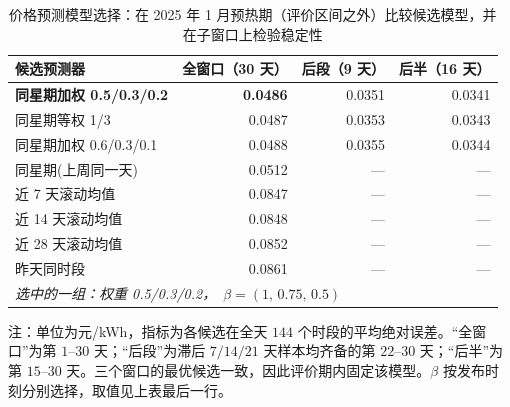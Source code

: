 \begin{table}[htbp]
  \centering
  \caption{价格预测模型选择：在 2025 年 1 月预热期（评价区间之外）比较候选模型，并在子窗口上检验稳定性}
  \label{tab:p4-select}
  \small
  \begin{tabular}{lrrr}
    \toprule
    候选预测器 & 全窗口（30 天） & 后段（9 天） & 后半（16 天） \\
    \midrule
    \textbf{同星期加权 0.5/0.3/0.2} & \textbf{0.0486} & 0.0351 & 0.0341 \\
    同星期等权 1/3 & 0.0487 & 0.0353 & 0.0343 \\
    同星期加权 0.6/0.3/0.1 & 0.0488 & 0.0355 & 0.0344 \\
    同星期(上周同一天) & 0.0512 & --- & --- \\
    近 7 天滚动均值 & 0.0847 & --- & --- \\
    近 14 天滚动均值 & 0.0848 & --- & --- \\
    近 28 天滚动均值 & 0.0852 & --- & --- \\
    昨天同时段 & 0.0861 & --- & --- \\
    \midrule
    \multicolumn{4}{l}{\textit{选中的一组：权重 0.5/0.3/0.2，}\ $\beta=(1,\,0.75,\,0.5)$} \\
    \bottomrule
  \end{tabular}
  \par\vspace{2pt}
  \begin{minipage}{\textwidth}\footnotesize
    注：单位为元/kWh，指标为各候选在全天 $144$ 个时段的平均绝对误差。“全窗口”为第 $1$--$30$ 天；“后段”为滞后 $7/14/21$ 天样本均齐备的第 $22$--$30$ 天；“后半”为第 $15$--$30$ 天。三个窗口的最优候选一致，因此评价期内固定该模型。$\beta$ 按发布时刻分别选择，取值见上表最后一行。
  \end{minipage}
\end{table}


